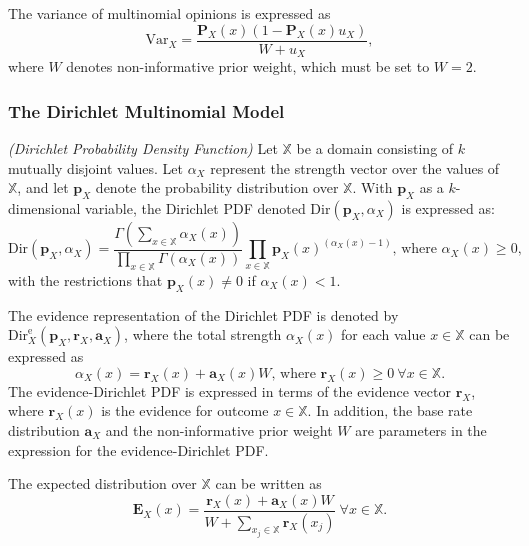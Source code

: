 The variance of multinomial opinions is expressed as
\begin{equation}
	\mathrm{Var}_X = \dfrac{\mathbf{P}_X(x)(1 - \mathbf{P}_X(x)u_X)}{W + u_X},
\end{equation}
where $W$ denotes non-informative prior weight, which must be set to $W = 2$.

\subsubsection{The Dirichlet Multinomial Model}

\begin{definition}
	\emph{(Dirichlet Probability Density Function)} Let $\mathbb{X}$ be a domain consisting of $k$ mutually disjoint values. Let $\alpha_X$ represent the strength vector over the values of $\mathbb{X}$, and let $\mathbf{p}_X$ denote the probability distribution over $\mathbb{X}$. With $\mathbf{p}_X$ as a $k$-dimensional variable, the Dirichlet PDF denoted $\mathrm{Dir}(\mathbf{p}_X, \alpha_{X})$ is expressed as:
	\begin{equation}
		\mathrm{Dir}(\mathbf{p}_X, \alpha_X) = \dfrac{\Gamma\left(\sum\limits_{x \in \mathbb{X}} \alpha_X(x)\right)}{\prod\limits_{x \in \mathbb{X}} \Gamma(\alpha_X(x))} \prod\limits_{x \in \mathbb{X}} \mathbf{p}_X(x)^{(\alpha_X(x)-1)} \text{, where } \alpha_X(x) \geq 0\text{,}
	\end{equation}
	with the restrictions that $\mathbf{p}_X(x) \neq 0$ if $\alpha_X(x)	< 1$.
\end{definition}

The evidence representation of the Dirichlet PDF is denoted by $\mathrm{Dir}^{\mathrm{e}}_X(\mathbf{p}_X, \mathbf{r}_X, \mathbf{a}_X)$, where the total strength $\alpha_X(x)$ for each value $x \in \mathbb{X}$ can be expressed as
\begin{equation}
    \alpha_X(x) = \mathbf{r}_X(x) + \mathbf{a}_X(x)W\text{, where }\mathbf{r}_X(x) \geq 0\ \forall x \in \mathbb{X}\text{.}
\end{equation}
The evidence-Dirichlet PDF is expressed in terms of the evidence vector $\mathbf{r}_X$, where $\mathbf{r}_X(x)$ is the evidence for outcome $x \in \mathbb{X}$. In addition, the base rate distribution $\mathbf{a}_X$ and the non-informative prior weight $W$ are parameters in the expression for
the evidence-Dirichlet PDF.

The expected distribution over $\mathbb{X}$ can be written as
\begin{equation}\label{eq:dirithlet_expected_probability}
    \mathbf{E}_X(x) = \dfrac{\mathbf{r}_X(x) + \mathbf{a}_X(x)W}{W + \sum\limits_{x_j \in \mathbb{X}} \mathbf{r}_X(x_j)}\ \forall x \in \mathbb{X}.
\end{equation}

